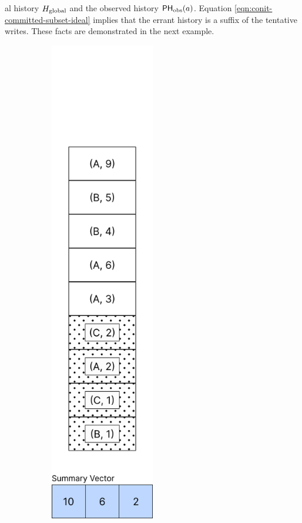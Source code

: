 \documentclass[]             %
{NASA}                       %
\theoremstyle{definition}
\begin{document}
al history $H_\mathrm{global}$ and the observed
history $\mathsf{PH}_{\mathrm{obs}}(a)$. Equation \eqref{eqn:conit-committed-subset-ideal}
implies that the errant history is a suffix of the tentative
writes. These facts are demonstrated in the next example.

\begin{figure}
  \begin{subfigure}{0.5\textwidth}
    \centering
    \includegraphics[width=0.5\textwidth]{images/conit/Order1.png}

\end{subfigure}
\end{figure}
\end{document}
